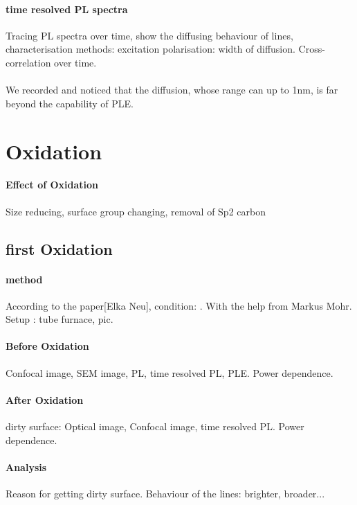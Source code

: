 \paragraph{time resolved PL spectra} Tracing PL spectra over time, show the diffusing behaviour of lines, characterisation methods: excitation polarisation: width of diffusion. Cross- correlation over time.
\paragraph{}We recorded and noticed that the diffusion, whose range can up to 1nm, is far beyond the capability of PLE. 

\section{Oxidation}
\paragraph{Effect of Oxidation} Size reducing, surface group changing, removal of Sp2 carbon

\subsection[first Oxidation]{first Oxidation}
\paragraph{method}According to the paper[Elka Neu], condition: . With the help from Markus Mohr. Setup : tube furnace, pic. 

\paragraph{Before Oxidation} Confocal image, SEM image, PL, time resolved PL, PLE. Power dependence.

\paragraph{After Oxidation}dirty surface: Optical image, Confocal image, time resolved PL. Power dependence.

\paragraph{Analysis} Reason for getting dirty surface. Behaviour of the lines: brighter, broader...

